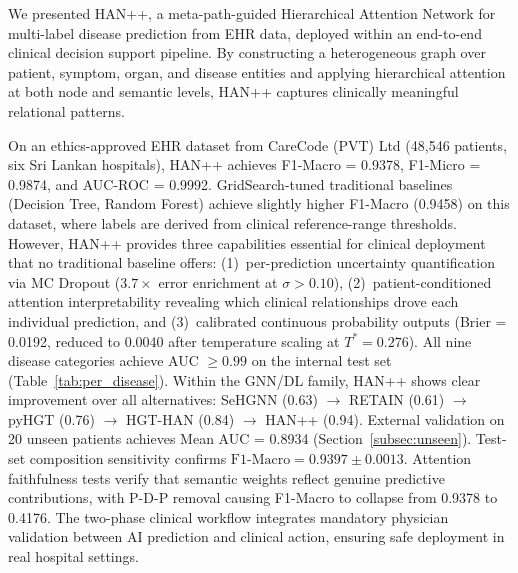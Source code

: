 \documentclass[conference]{IEEEtran}
\begin{document}
We presented HAN++, a meta-path-guided Hierarchical Attention Network for
multi-label disease prediction from EHR data, deployed within an
end-to-end clinical decision support pipeline.
By constructing a heterogeneous graph over patient, symptom, organ, and
disease entities and applying hierarchical attention at both node and
semantic levels, HAN++ captures clinically meaningful relational patterns.

On an ethics-approved EHR dataset from CareCode (PVT) Ltd (48,546 patients,
six Sri Lankan hospitals), HAN++ achieves
F1-Macro = 0.9378, F1-Micro = 0.9874, and AUC-ROC = 0.9992.
GridSearch-tuned traditional baselines (Decision Tree, Random Forest)
achieve slightly higher F1-Macro (0.9458) on this dataset, where
labels are derived from clinical reference-range thresholds.
However, HAN++ provides three capabilities essential for clinical
deployment that no traditional baseline offers:
(1)~per-prediction uncertainty quantification via MC Dropout
($3.7\times$ error enrichment at $\sigma > 0.10$),
(2)~patient-conditioned attention interpretability revealing which
clinical relationships drove each individual prediction, and
(3)~calibrated continuous probability outputs (Brier = 0.0192,
reduced to 0.0040 after temperature scaling at $T^* = 0.276$).
All nine disease categories achieve AUC $\geq 0.99$ on the
internal test set (Table~\ref{tab:per_disease}).
Within the GNN/DL family, HAN++ shows clear improvement over all
alternatives: SeHGNN (0.63) $\to$ RETAIN (0.61) $\to$ pyHGT (0.76) $\to$
HGT-HAN (0.84) $\to$ HAN++ (0.94).
External validation on 20 unseen patients achieves
Mean AUC = 0.8934 (Section~\ref{subsec:unseen}).
Test-set composition sensitivity confirms $\text{F1-Macro} = 0.9397 \pm 0.0013$.
Attention faithfulness tests verify that semantic weights reflect genuine
predictive contributions, with P-D-P removal causing F1-Macro to collapse
from 0.9378 to 0.4176.
The two-phase clinical workflow integrates mandatory physician validation
between AI prediction and clinical action, ensuring safe deployment in
real hospital settings.
\end{document}
